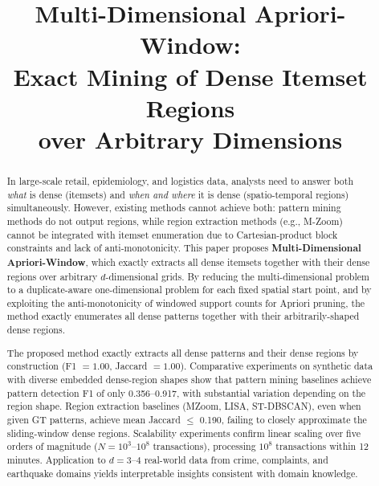 \documentclass[conference]{IEEEtran}
\begin{document}
\title{Multi-Dimensional Apriori-Window: \\
Exact Mining of Dense Itemset Regions\\
over Arbitrary Dimensions}

\author{
  \and
}

\maketitle
\pagestyle{plain}

\begin{abstract}
In large-scale retail, epidemiology, and logistics data,
analysts need to answer both
\emph{what} is dense (itemsets) and
\emph{when and where} it is dense (spatio-temporal regions)
simultaneously.
However, existing methods cannot achieve both:
pattern mining methods do not output regions,
while region extraction methods (e.g., M-Zoom)
cannot be integrated with itemset enumeration
due to Cartesian-product block constraints
and lack of anti-monotonicity.
This paper proposes \textbf{Multi-Dimensional Apriori-Window},
which exactly extracts all dense itemsets together with
their dense regions over arbitrary $d$-dimensional grids.
By reducing the multi-dimensional problem
to a duplicate-aware one-dimensional problem
for each fixed spatial start point,
and by exploiting the anti-monotonicity
of windowed support counts for Apriori pruning,
the method exactly enumerates all dense patterns
together with their arbitrarily-shaped dense regions.

The proposed method exactly extracts all dense patterns
and their dense regions by construction
(F1 $= 1.00$, Jaccard $= 1.00$).
Comparative experiments on synthetic data
with diverse embedded dense-region shapes
show that pattern mining baselines achieve
pattern detection F1 of only 0.356--0.917,
with substantial variation depending on the region shape.
Region extraction baselines (MZoom, LISA, ST-DBSCAN),
even when given GT patterns,
achieve mean Jaccard $\leq$ 0.190,
failing to closely approximate the sliding-window dense regions.
Scalability experiments confirm linear scaling
over five orders of magnitude
($N = 10^3$--$10^8$ transactions),
processing $10^8$ transactions within 12 minutes.
Application to $d{=}3$--$4$ real-world data from crime,
complaints, and earthquake domains
yields interpretable insights consistent with domain knowledge.
\end{abstract}
\end{document}
